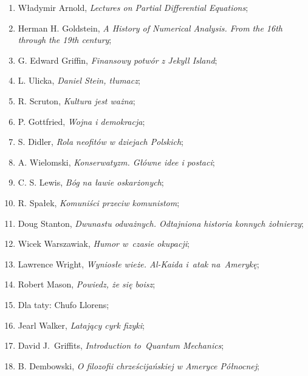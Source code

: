 \documentclass[a4paper,11pt]{article}
\begin{document}
\begin{enumerate}
\item Władymir Arnold, \textit{Lectures on Partial Differential
    Equations};

\item Herman H. Goldstein, \textit{A History of Numerical Analysis. From
    the 16th through the 19th century};

\item G. Edward Griffin, \textit{Finansowy potwór z Jekyll Island};

\item L. Ulicka, \textit{Daniel Stein, tłumacz};

\item R. Scruton, \textit{Kultura jest ważna};

\item P. Gottfried, \textit{Wojna i demokracja};

\item S. Didler, \textit{Rola neofitów w dziejach Polskich};

\item A. Wielomski, \textit{Konserwatyzm. Główne idee i postaci};

\item C. S. Lewis, \textit{Bóg na ławie oskarżonych};

\item R. Spałek, \textit{Komuniści przeciw komunistom};

\item Doug Stanton, \textit{Dwunastu odważnych. Odtajniona historia
    konnych żołnierzy};

\item Wicek Warszawiak, \textit{Humor w~czasie okupacji};

\item Lawrence Wright, \textit{Wyniosłe wieże. Al-Kaida i~atak
    na~Amerykę};

\item Robert Mason, \textit{Powiedz, że się boisz};

\item Dla taty: Chufo Llorens;

\item Jearl Walker, \textit{Latający cyrk fizyki};

\item David J.~Griffits, \textit{Introduction to~Quantum Mechanics};

\item B. Dembowski, \textit{O filozofii chrześcijańskiej w Ameryce
    Północnej};


\end{enumerate}
\end{document}
